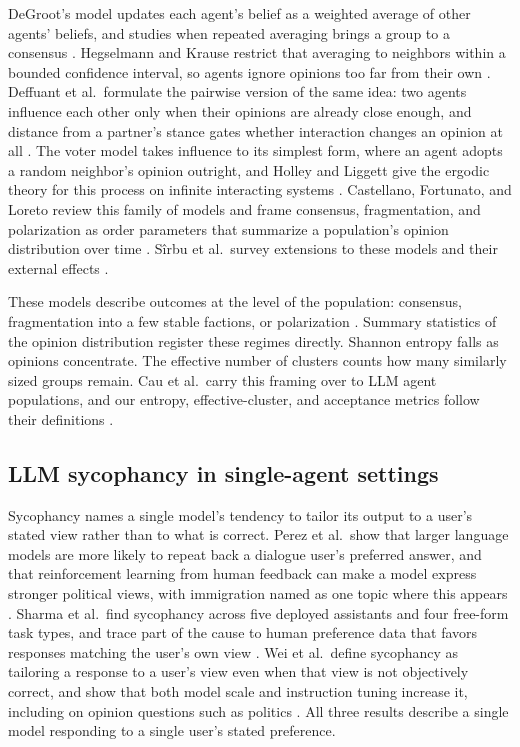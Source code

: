 \documentclass[11pt,a4paper]{article}
\begin{document}
DeGroot's model updates each agent's belief as a weighted average of other agents' beliefs, and studies when repeated averaging brings a group to a consensus \citep{degroot1974consensus}. Hegselmann and Krause restrict that averaging to neighbors within a bounded confidence interval, so agents ignore opinions too far from their own \citep{hegselmann2002opinion}. Deffuant et al.\ formulate the pairwise version of the same idea: two agents influence each other only when their opinions are already close enough, and distance from a partner's stance gates whether interaction changes an opinion at all \citep{deffuant2000mixing}. The voter model takes influence to its simplest form, where an agent adopts a random neighbor's opinion outright, and Holley and Liggett give the ergodic theory for this process on infinite interacting systems \citep{holley1975ergodic}. Castellano, Fortunato, and Loreto review this family of models and frame consensus, fragmentation, and polarization as order parameters that summarize a population's opinion distribution over time \citep{castellano2009statistical}. Sîrbu et al.\ survey extensions to these models and their external effects \citep{sirbu2017opinion}.

These models describe outcomes at the level of the population: consensus, fragmentation into a few stable factions, or polarization \citep{castellano2009statistical}. Summary statistics of the opinion distribution register these regimes directly. Shannon entropy falls as opinions concentrate. The effective number of clusters counts how many similarly sized groups remain. Cau et al.\ carry this framing over to LLM agent populations, and our entropy, effective-cluster, and acceptance metrics follow their definitions \citep{cau2025selective}.

\subsection{LLM sycophancy in single-agent settings}\label{sec:2.2}

Sycophancy names a single model's tendency to tailor its output to a user's stated view rather than to what is correct. Perez et al.\ show that larger language models are more likely to repeat back a dialogue user's preferred answer, and that reinforcement learning from human feedback can make a model express stronger political views, with immigration named as one topic where this appears \citep{perez2023discovering}. Sharma et al.\ find sycophancy across five deployed assistants and four free-form task types, and trace part of the cause to human preference data that favors responses matching the user's own view \citep{sharma2023sycophancy}. Wei et al.\ define sycophancy as tailoring a response to a user's view even when that view is not objectively correct, and show that both model scale and instruction tuning increase it, including on opinion questions such as politics \citep{wei2023synthetic}. All three results describe a single model responding to a single user's stated preference.
\end{document}
